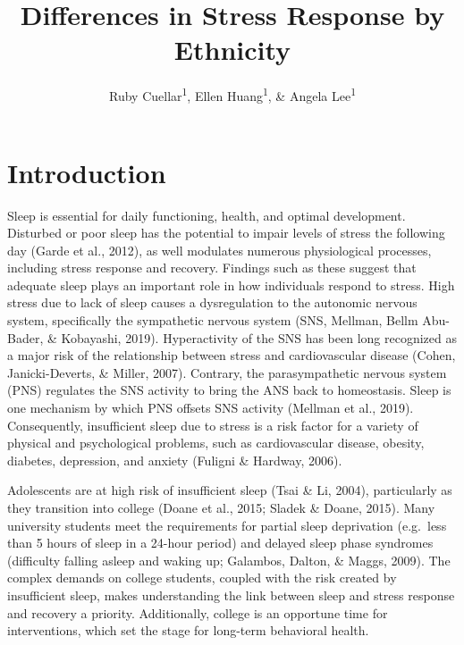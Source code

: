 \documentclass[man]{apa6}
\title{Differences in Stress Response by Ethnicity}
\author{Ruby Cuellar\textsuperscript{1}, Ellen Huang\textsuperscript{1}, \& Angela Lee\textsuperscript{1}}
\date{}
\affiliation{
\vspace{0.5cm}
\textsuperscript{1} University of Oregon}
\begin{document}
\maketitle

\hypertarget{introduction}{%
\section{Introduction}\label{introduction}}

Sleep is essential for daily functioning, health, and optimal development. Disturbed or poor sleep has the potential to impair levels of stress the following day (Garde et al., 2012), as well modulates numerous physiological processes, including stress response and recovery. Findings such as these suggest that adequate sleep plays an important role in how individuals respond to stress. High stress due to lack of sleep causes a dysregulation to the autonomic nervous system, specifically the sympathetic nervous system (SNS, Mellman, Bellm Abu-Bader, \& Kobayashi, 2019). Hyperactivity of the SNS has been long recognized as a major risk of the relationship between stress and cardiovascular disease (Cohen, Janicki-Deverts, \& Miller, 2007). Contrary, the parasympathetic nervous system (PNS) regulates the SNS activity to bring the ANS back to homeostasis. Sleep is one mechanism by which PNS offsets SNS activity (Mellman et al., 2019). Consequently, insufficient sleep due to stress is a risk factor for a variety of physical and psychological problems, such as cardiovascular disease, obesity, diabetes, depression, and anxiety (Fuligni \& Hardway, 2006).

Adolescents are at high risk of insufficient sleep (Tsai \& Li, 2004), particularly as they transition into college (Doane et al., 2015; Sladek \& Doane, 2015). Many university students meet the requirements for partial sleep deprivation (e.g.~less than 5 hours of sleep in a 24-hour period) and delayed sleep phase syndromes (difficulty falling asleep and waking up; Galambos, Dalton, \& Maggs, 2009). The complex demands on college students, coupled with the risk created by insufficient sleep, makes understanding the link between sleep and stress response and recovery a priority. Additionally, college is an opportune time for interventions, which set the stage for long-term behavioral health.
\end{document}
